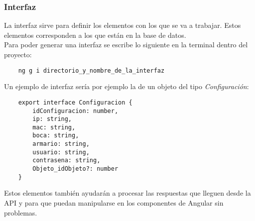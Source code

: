 \subsubsection{Interfaz}
La interfaz \cite{angular-interfaces} sirve para definir los elementos con los que se va a trabajar. Estos elementos corresponden a los que están en la base de datos.
\\Para poder generar una interfaz se escribe lo siguiente en la terminal dentro del proyecto:
\begin{verbatim}
    ng g i directorio_y_nombre_de_la_interfaz
\end{verbatim}
Un ejemplo de interfaz sería por ejemplo la de un objeto del tipo \textit{Configuración}:
\begin{verbatim}
    export interface Configuracion {
        idConfiguracion: number,
        ip: string,
        mac: string,
        boca: string,
        armario: string,
        usuario: string,
        contrasena: string,
        Objeto_idObjeto?: number
    }
\end{verbatim}
Estos elementos también ayudarán a procesar las respuestas que lleguen desde la API y para que puedan manipularse en los componentes de Angular sin problemas.